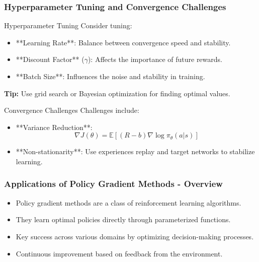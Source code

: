\documentclass[aspectratio=169]{beamer}
\begin{document}
\begin{frame}[fragile]
    \frametitle{Hyperparameter Tuning and Convergence Challenges}
    \begin{block}{Hyperparameter Tuning}
        Consider tuning:
        \begin{itemize}
            \item **Learning Rate**: Balance between convergence speed and stability.
            \item **Discount Factor** ($\gamma$): Affects the importance of future rewards.
            \item **Batch Size**: Influences the noise and stability in training.
        \end{itemize}
        \textbf{Tip:} Use grid search or Bayesian optimization for finding optimal values.
    \end{block}

    \begin{block}{Convergence Challenges}
        Challenges include:
        \begin{itemize}
            \item **Variance Reduction**: 
            \begin{equation}
            \nabla J(\theta) = \mathbb{E}[(R - b) \nabla \log \pi_{\theta}(a|s)]
            \end{equation}
            \item **Non-stationarity**: Use experiences replay and target networks to stabilize learning.
        \end{itemize}
    \end{block}
\end{frame}

\begin{frame}[fragile]
  \frametitle{Applications of Policy Gradient Methods - Overview}
  \begin{itemize}
    \item Policy gradient methods are a class of reinforcement learning algorithms.
    \item They learn optimal policies directly through parameterized functions.
    \item Key success across various domains by optimizing decision-making processes.
    \item Continuous improvement based on feedback from the environment.
  \end{itemize}
\end{frame}
\end{document}

